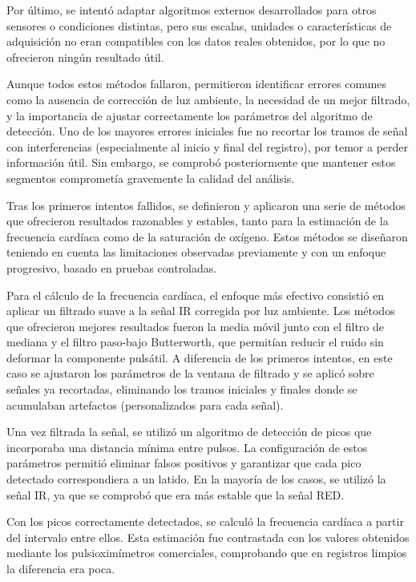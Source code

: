 Por último, se intentó adaptar algoritmos externos desarrollados para otros sensores o condiciones distintas, pero sus escalas, unidades o características de adquisición no eran compatibles con los datos reales obtenidos, por lo que no ofrecieron ningún resultado útil.

Aunque todos estos métodos fallaron, permitieron identificar errores comunes como la ausencia de corrección de luz ambiente, la necesidad de un mejor filtrado, y la importancia de ajustar correctamente los parámetros del algoritmo de detección.  Uno de los mayores errores iniciales fue no recortar los tramos de señal con interferencias (especialmente al inicio y final del registro), por temor a perder información útil. Sin embargo, se comprobó posteriormente que mantener estos segmentos comprometía gravemente la calidad del análisis. 

Tras los primeros intentos fallidos, se definieron y aplicaron una serie de métodos que ofrecieron resultados razonables y estables, tanto para la estimación de la frecuencia cardíaca como de la saturación de oxígeno. Estos métodos se diseñaron teniendo en cuenta las limitaciones observadas previamente y con un enfoque progresivo, basado en pruebas controladas.

Para el cálculo de la frecuencia cardíaca, el enfoque más efectivo consistió en aplicar un filtrado suave a la señal IR corregida por luz ambiente. Los métodos que ofrecieron mejores resultados fueron la media móvil junto con el filtro de mediana y el filtro paso-bajo Butterworth, que permitían reducir el ruido sin deformar la componente pulsátil. A diferencia de los primeros intentos, en este caso se ajustaron los parámetros de la ventana de filtrado y se aplicó sobre señales ya recortadas, eliminando los tramos iniciales y finales donde se acumulaban artefactos (personalizados para cada señal).

Una vez filtrada la señal, se utilizó un algoritmo de detección de picos que incorporaba una distancia mínima entre pulsos. La configuración de estos parámetros permitió eliminar falsos positivos y garantizar que cada pico detectado correspondiera a un latido. En la mayoría de los casos, se utilizó la señal IR, ya que se comprobó que era más estable que la señal RED.

Con los picos correctamente detectados, se calculó la frecuencia cardíaca a partir del intervalo entre ellos. Esta estimación fue contrastada con los valores obtenidos mediante los pulsioximímetros comerciales, comprobando que en registros limpios la diferencia era poca.

